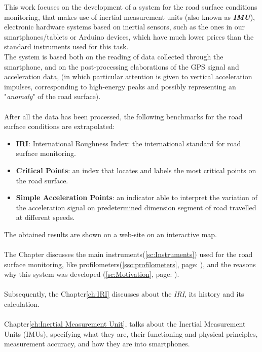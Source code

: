 \documentclass[tesi]{subfiles}
\begin{document}
\noindent
This work focuses on the development of a system for the road surface conditions monitoring, that makes use of inertial measurement units (also known as \textbf{\textit{IMU}}), electronic hardware systems based on inertial sensors, such as the ones in our smartphones/tablets or Arduino devices, which have much lower prices than the standard instruments used for this task.\\
The system is based both on the reading of data collected through the smartphone, and on the post-processing elaborations of the GPS signal and acceleration data, (in which particular attention is given to vertical acceleration impulses, corresponding to high-energy peaks and possibly representing an "\textit{anomaly}" of the road surface).\\\\
\noindent After all the data has been processed, the following benchmarks for the road surface conditions are extrapolated:
\begin{itemize}\label{it:indexes}
\item \textbf{IRI}: International Roughness Index: the international standard for road surface monitoring.
\item \textbf{Critical Points}: an index that locates and labels the most critical points on the road surface.
\item \textbf{Simple Acceleration Points}: an indicator able to interpret the variation of the acceleration signal on predetermined dimension segment of road travelled at different speeds.
\end{itemize}
\clearpage
\noindent The obtained results are shown on a web-site on an interactive map.
\\\\
The  Chapter discusses the main instruments{\footnotesize (\ref{sc:Instruments})} used for the road surface monitoring, like profilometers{\footnotesize (\ref{ssc:profilometers}, page: \pageref{ssc:profilometers})}, and the reasons why this system was developed  {\footnotesize (\ref{sc:Motivation}, page: \pageref{sc:Motivation})}.\\\\
Subsequently, the Chapter\ref{ch:IRI} discusses about the \textit{IRI}, its history and its calculation.\\\\
Chapter\ref{ch:Inertial Measurement Unit}, talks about the Inertial Measurement Units (IMUs), specifying what they are, their functioning and physical principles, measurement accuracy, and how they are into smartphones.\\\\
\end{document}
